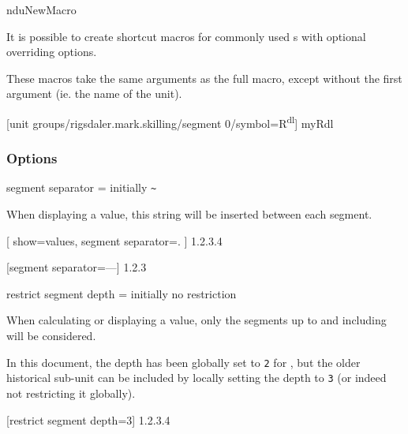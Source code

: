 \documentclass{article}
\begin{document}
\begin{docCommand}
	{nduNewMacro}
	{}

	It is possible to create shortcut macros for commonly used s with optional overriding options.

	These macros take the same arguments as the full  macro, except without the first argument (ie. the name of the unit).

\begin{dispExample}
	[unit groups/rigsdaler.mark.skilling/segment 0/symbol={R\textsuperscript{dl}}]
	{myRdl}
\end{dispExample}

\end{docCommand}

\clearpage
\subsubsection{Options}

\begin{docKey}
	{segment separator}
	{=}
	{initially \texttt{\~{}}}
	
	When displaying a value, this string will be inserted between each segment.

\begin{dispExample}
[
		show=values,
		segment separator=.
	]
	{1.2.3.4}

	[segment separator={---}]
	{1.2.3}
\end{dispExample}

\end{docKey}

\begin{docKey}
	{restrict segment depth}
	{=}
	{initially no restriction}
	
	When calculating or displaying a value, only the segments up to and including  will be considered.
	
	In this document, the depth has been globally set to \texttt{2} for , but the older historical sub-unit  can be included by locally setting the depth to \texttt{3} (or indeed not restricting it globally).
	
\begin{dispExample}
	[restrict segment depth=3]
	{1.2.3.4}
\end{dispExample}
\end{docKey}
\end{document}
